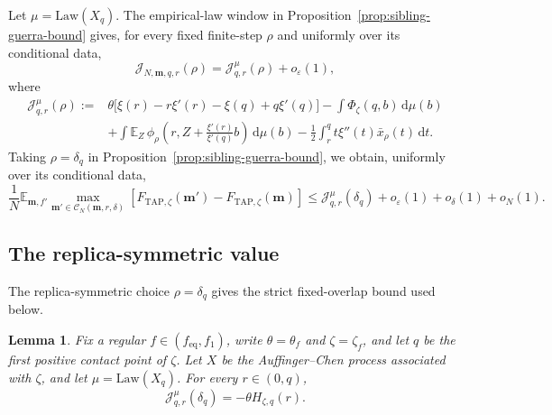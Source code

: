 \documentclass[a4paper,10pt,reqno]{amsart}
\numberwithin{equation}{section}
\newtheorem{lemma}[proposition]{Lemma}%
\newcommand{\ve}{\varepsilon}
\newcommand{\dE}{\mathbb{E}}%
\newcommand{\Law}{\mathrm{Law}}
\newcommand{\mc}{\mathcal}
\newcommand{\dd}{\mathrm{d}}
\newcommand{\TAP}{\mathrm{TAP}}
\newcommand{\eq}{\mathrm{eq}}
\newcommand{\bfm}{\mathbf{m}}
\begin{document}
	Let \(\mu=\Law(X_q)\). The empirical-law window in
	Proposition~\ref{prop:sibling-guerra-bound} gives, for every fixed
	finite-step \(\rho\) and uniformly over its conditional data,
	\[
	\mc J_{N,\bfm,q,r}(\rho)
	=
	\mc J_{q,r}^{\mu}(\rho)+o_\ve(1),
	\]
	where
	\begin{equation}\label{eq:sibling-functional-limit}
		\begin{aligned}
			\mc J_{q,r}^{\mu}(\rho)
			:={}&
			\theta\bigl[\xi(r)-r\xi'(r)-\xi(q)+q\xi'(q)\bigr]
			-\int\Phi_\zeta(q,b)\,\dd\mu(b)\\
			&+\int\dE_Z\,\phi_\rho\left(
			r,Z+\frac{\xi'(r)}{\xi'(q)}b
			\right)\,\dd\mu(b)
			-\frac12\int_r^q t\xi''(t)\bar x_\rho(t)\,\dd t.
		\end{aligned}
	\end{equation}
	Taking \(\rho=\delta_q\) in
	Proposition~\ref{prop:sibling-guerra-bound}, we obtain, uniformly over its
	conditional data,
	\begin{equation}\label{eq:sibling-guerra-bound-limit}
		\frac1N\dE_{\bfm,f'}
		\max_{\bfm'\in\mc C_N(\bfm,r,\delta)}
		\left[
		F_{\TAP,\zeta}(\bfm')-F_{\TAP,\zeta}(\bfm)
		\right]
		\le
		\mc J_{q,r}^{\mu}(\delta_q)
		+o_\ve(1)+o_\delta(1)+o_N(1).
	\end{equation}
	
	\subsection{The replica-symmetric value}
	
	The replica-symmetric choice \(\rho=\delta_q\) gives the strict
	fixed-overlap bound used below.
	
	\begin{lemma}
		Fix a regular \(f\in(f_{\eq},f_1)\), write
		\(\theta=\theta_f\) and \(\zeta=\zeta_f\), and let \(q\) be the first
		positive contact point of \(\zeta\). Let \(X\) be the
		Auffinger--Chen process associated with \(\zeta\), and let
		\(\mu=\Law(X_q)\). For every \(r\in(0,q)\),
		\begin{equation}\label{eq:sibling-rs-value}
			\mc J_{q,r}^{\mu}(\delta_q)
			=
			-\theta H_{\zeta,q}(r).
		\end{equation}
	\end{lemma}
	
\end{document}
